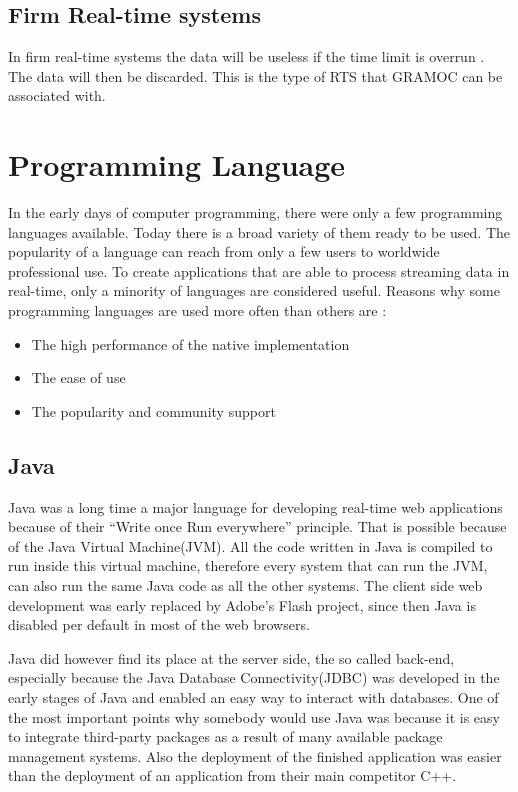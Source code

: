\subsection{Firm Real-time systems}

In firm real-time systems the data will be useless if the time limit is overrun \autocite{RealTimeHermannKopetz}. The data will then be discarded. This is the type of RTS that GRAMOC can be associated with.

\author{Nico Leidenfrost}
%
\section{Programming Language}
In the early days of computer programming, there were only a few programming languages available. Today there is a broad variety of them ready to be used. The popularity of a language can reach from only a few users to worldwide professional use. To create applications that are able to process streaming data in real-time, only a minority of languages are considered useful. Reasons why some programming languages are used more often than others are \autocite{RealTimeByronEllis}:

\begin{itemize}
    \item The high performance of the native implementation
    \item The ease of use
    \item The popularity and community support
\end{itemize}

\subsection{Java}
Java was a long time a major language for developing real-time web applications because of their ``Write once Run everywhere'' principle. That is possible because of the Java Virtual Machine(JVM). All the code written in Java is compiled to run inside this virtual machine, therefore every system that can run the JVM, can also run the same Java code as all the other systems. The client side web development was early replaced by Adobe's Flash project, since then Java is disabled per default in most of the web browsers.

Java did however find its place at the server side, the so called back-end, especially because the Java Database Connectivity(JDBC) was developed in the early stages of Java and enabled an easy way to interact with databases. One of the most important points why somebody would use Java was because it is easy to integrate third-party packages as a result of many available package management systems. Also the deployment of the finished application was easier than the deployment of an application from their main competitor C++.

